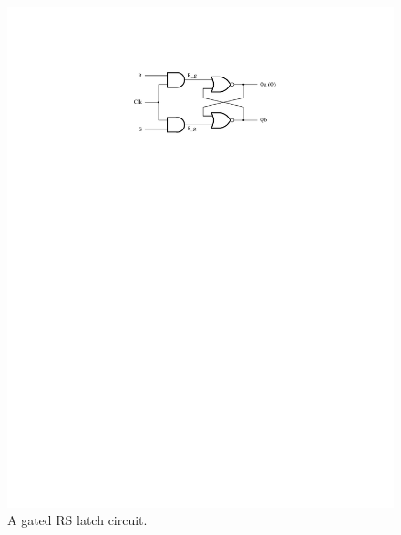 \documentclass[epsfig,10pt,fullpage]{article}
\begin{document}
\begin{figure}[H]
	\begin{center}
		\includegraphics[]{figures/RS_latch.pdf}
	\end{center}
\caption{A gated RS latch circuit.}
\label{fig:RSlatch}
\end{figure}
\end{document}
